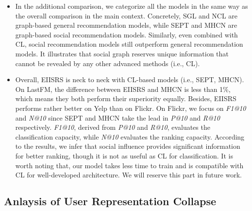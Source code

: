 \documentclass[letterpaper]{article} %
\begin{document}
\begin{itemize}
    \item In the additional comparison, we categorize all the models in the same way as the overall comparison in the main context. Concretely, SGL and NCL are graph-based general recommendation models, while SEPT and MHCN are graph-based social recommendation models. Similarly, even combined with CL, social recommendation models still outperform general recommendation models. It illustrates that social graph reserves unique information that cannot be revealed by any other advanced methods (i.e., CL).
    \item Overall, EIISRS is neck to neck with CL-based models (i.e., SEPT, MHCN). On LastFM, the difference between EIISRS and MHCN is less than 1\%, which means they both perform their superiority equally. Besides, EIISRS performs rather better on Yelp than on Flickr. On Flickr, we focus on \textit{F1@10} and \textit{N@10} since SEPT and MHCN take the lead in \textit{P@10} and \textit{R@10} respectively. \textit{F1@10}, derived from \textit{P@10} and \textit{R@10}, evaluates the classification capacity, while \textit{N@10} evaluates the ranking capacity. According to the results, we infer that social influence provides significant information for better ranking, though it is not as useful as CL for classification. It is worth noting that, our model takes less time to train and is compatible with CL for well-developed architecture. We will reserve this part in future work.
\end{itemize}

\subsection{Anlaysis of User Representation Collapse}
\end{document}
